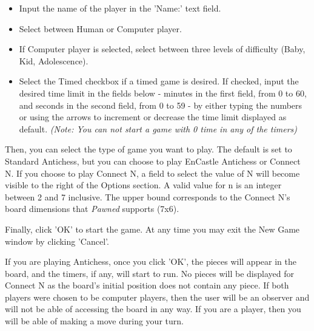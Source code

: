 \documentclass{report}
\begin{document}
				\begin{itemize}
					\item Input the name of the player in the 'Name:' text field.
					\item Select between Human or Computer player.
					\item If Computer player is selected, select between three levels of 
								difficulty (Baby, Kid, Adolescence).
					\item Select the Timed checkbox if a timed game is desired. If checked, 
								input the desired time limit in the fields below - minutes in the 
								first field, from 0 to 60, and seconds in the second field, from 0 to
								59 - by either typing the numbers or using the arrows to increment 
								or decrease the time limit displayed as default. \textit{(Note: You
								can not start a game with 0 time in any of the timers)}
				\end{itemize}
			Then, you can select the type of game you want to play. The default is set to
			Standard Antichess, but you can choose to play EnCastle Antichess or Connect N. 
			If you choose to play Connect N, a field to select the value of N will become 
			visible to the right of the Options section. A valid value for n is an integer 
			between 2 and 7 inclusive. The upper bound corresponds to the Connect N's board 
			dimensions that \emph{Pawned} supports (7x6).
			
			Finally, click 'OK' to start the game. At any time you may exit the New Game window
			by clicking 'Cancel'.
			
			If you are playing Antichess, once you click 'OK', the pieces will appear in the 
			board, and the timers, if any, will start to run. No pieces will be displayed for
			Connect N as the board's initial position does not contain any piece. If both 
			players were chosen to be computer players, then the user will be an observer 
			and will not be able of accessing the board in any way. If you are a player, 
			then you will be able of making a move during your turn.
			
\end{document}
